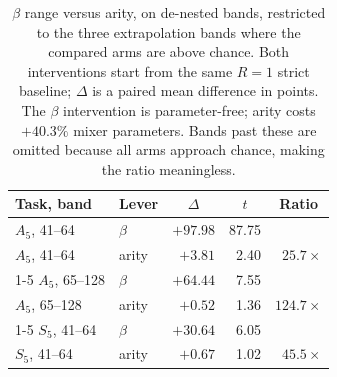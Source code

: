 \documentclass[10pt,twocolumn]{article}
\newcommand{\hd}[1]{\multicolumn{1}{c}{#1}}
\begin{document}
\begin{table}[t]
\centering
\footnotesize
\caption{$\beta$ range versus arity, on de-nested bands, restricted to the three
extrapolation bands where the compared arms are above chance. Both interventions
start from the same $R{=}1$ strict baseline; $\Delta$ is a paired mean
difference in points. The $\beta$ intervention is parameter-free; arity costs
$+40.3\%$ mixer parameters. Bands past these are omitted because all arms
approach chance, making the ratio meaningless.}
\label{tab:cost}
\begin{tabular}{llrrr}
\toprule
Task, band & Lever & \hd{$\Delta$} & \hd{$t$} & \hd{Ratio} \\
\midrule
$A_5$, 41--64  & $\beta$ & $+97.98$ & 87.75 & \\
$A_5$, 41--64  & arity   & $+3.81$  & 2.40  & $25.7\times$ \\
\cmidrule(lr){1-5}
$A_5$, 65--128 & $\beta$ & $+64.44$ & 7.55  & \\
$A_5$, 65--128 & arity   & $+0.52$  & 1.36  & $124.7\times$ \\
\cmidrule(lr){1-5}
$S_5$, 41--64  & $\beta$ & $+30.64$ & 6.05  & \\
$S_5$, 41--64  & arity   & $+0.67$  & 1.02  & $45.5\times$ \\
\bottomrule
\end{tabular}
\end{table}
\end{document}
